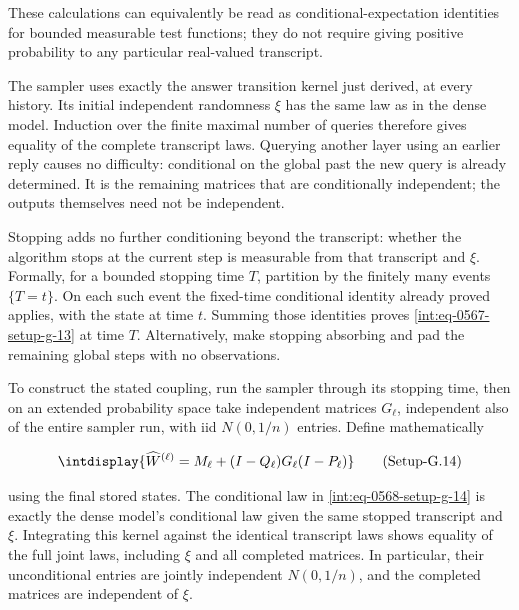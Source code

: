 
These calculations can equivalently be read as conditional-expectation identities for bounded measurable test functions; they do not require giving positive probability to any particular real-valued transcript.



The sampler uses exactly the answer transition kernel just derived, at every history. Its initial independent randomness \(\xi\) has the same law as in the dense model. Induction over the finite maximal number of queries therefore gives equality of the complete transcript laws. Querying another layer using an earlier reply causes no difficulty: conditional on the global past the new query is already determined. It is the remaining matrices that are conditionally independent; the outputs themselves need not be independent.



Stopping adds no further conditioning beyond the transcript: whether the algorithm stops at the current step is measurable from that transcript and \(\xi\). Formally, for a bounded stopping time \(T\), partition by the finitely many events \(\{T=t\}\). On each such event the fixed-time conditional identity already proved applies, with the state at time \(t\). Summing those identities proves \hyperref[int:eq-setup-g-13]{\eqref{int:eq-0567-setup-g-13}} at time \(T\). Alternatively, make stopping absorbing and pad the remaining global steps with no observations.



To construct the stated coupling, run the sampler through its stopping time, then on an extended probability space take independent matrices \(G_\ell\), independent also of the entire sampler run, with iid \(N(0,\allowbreak 1/n)\) entries. Define mathematically


\label{int:eq-setup-g-14}
\begingroup\renewcommand{\theHequation}{intdisplay.1075}
\begin{equation}
\intdisplay{
\widehat W^{(\ell)}
 =M_\ell+(I-Q_\ell)G_\ell(I-P_\ell)
}
\tag{Setup-G.14}
\label{int:eq-0568-setup-g-14}
\end{equation}
\endgroup


using the final stored states. The conditional law in \hyperref[int:eq-setup-g-14]{\eqref{int:eq-0568-setup-g-14}} is exactly the dense model's conditional law given the same stopped transcript and \(\xi\). Integrating this kernel against the identical transcript laws shows equality of the full joint laws, including \(\xi\) and all completed matrices. In particular, their unconditional entries are jointly independent \(N(0,\allowbreak 1/n)\), and the completed matrices are independent of \(\xi\).


